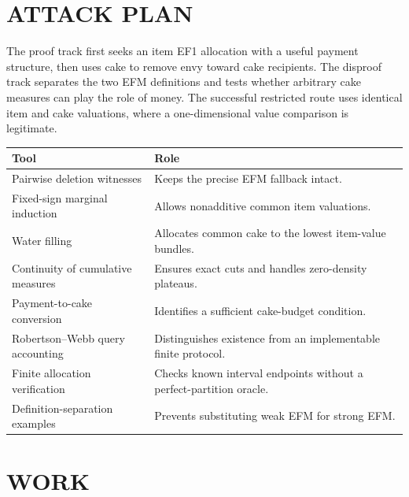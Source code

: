 \documentclass[11pt,a4paper]{article}
\theoremstyle{remark}\newtheorem{remark}[theorem]{Remark}
\begin{document}
\section{ATTACK PLAN}
The proof track first seeks an item EF1 allocation with a useful payment structure, then uses cake to remove envy toward cake recipients. The disproof track separates the two EFM definitions and tests whether arbitrary cake measures can play the role of money. The successful restricted route uses identical item and cake valuations, where a one-dimensional value comparison is legitimate.

\begin{center}\begin{tabular}{p{.26\linewidth}p{.65\linewidth}}\toprule Tool&Role\\\midrule
Pairwise deletion witnesses&Keeps the precise EFM fallback intact.\\
Fixed-sign marginal induction&Allows nonadditive common item valuations.\\
Water filling&Allocates common cake to the lowest item-value bundles.\\
Continuity of cumulative measures&Ensures exact cuts and handles zero-density plateaus.\\
Payment-to-cake conversion&Identifies a sufficient cake-budget condition.\\
Robertson--Webb query accounting&Distinguishes existence from an implementable finite protocol.\\
Finite allocation verification&Checks known interval endpoints without a perfect-partition oracle.\\
Definition-separation examples&Prevents substituting weak EFM for strong EFM.\\\bottomrule\end{tabular}\end{center}

\section{WORK}
\end{document}
